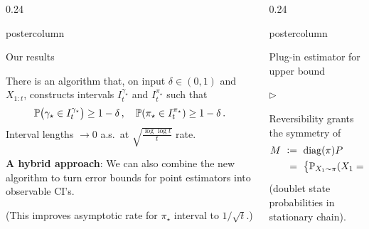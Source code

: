 \documentclass[notheorems,final]{beamer}
\newcommand{\compresslist}{%
  \setlength{\itemsep}{1pt}%
  \setlength{\parskip}{0pt}%
  \setlength{\parsep}{0pt}%
  \setlength{\leftmargin}{0.7cm}%
}
\newlength{\columnheight}
\newcommand\pimin{\ensuremath{\pi_{\star}}}
\newcommand\gap{\ensuremath{\gamma_{\star}}}
\newcommand\states{\ensuremath{\mathcal{X}}}
\begin{document}
\begin{frame}{}
\begin{columns}
\begin{column}{0.24\textwidth}
\begin{beamercolorbox}[center,wd=\textwidth]{postercolumn}
\begin{minipage}[T]{.95\textwidth}
{\begin{block}{Our results}
                \begin{theorem}
                  There is an algorithm that, on input $\delta \in
                  (0,1)$ and $X_{1:t}$, constructs intervals
                  $I_t^{\gap}$ and $I_t^{\pimin}$ such that
                  \[
                    \P\Parens{
                      \gap \in I_t^{\gap}
                    }
                    \geq 1-\delta
                    \,,
                    \quad
                    \P\Parens{
                      \pimin \in I_t^{\pimin}
                    }
                    \geq 1-\delta
                    \,.
                  \]
                  Interval lengths $\to0$ a.s.~at
                  $\sqrt{\frac{\log\log t}{t}}$ rate.
                \end{theorem}

                \bigskip
                \textbf{A hybrid approach}:
                We can also combine the new algorithm to turn error
                bounds for point estimators into observable CI's.

                {\small(This improves asymptotic rate for $\pimin$
                interval to $1/\sqrt{t}$.)}

              \end{block}
            }
          \end{minipage}
        \end{beamercolorbox}
      \end{column}
      \begin{column}{0.24\textwidth}
        \begin{beamercolorbox}[center,wd=\textwidth]{postercolumn}
          \begin{minipage}[T]{.95\textwidth}
            \parbox[t][\columnheight]{\textwidth}{
              \begin{block}{Plug-in estimator for upper bound}
                \begin{list}{$\triangleright$}\compresslist
                  \item
                    Reversibility grants the symmetry of
                    \begin{align*}
                      M
                      & \ := \
                      \diag(\pi) P
                      \\
                      & \ \hphantom:= \
                      \Braces{ \P_{X_1 \sim \pi}(X_1=x,X_2=x') }_{x,x'\in\states}
                    \end{align*}
                    {\small(doublet state probabilities in stationary chain)}.


\end{list}
\end{block}}
\end{minipage}
\end{beamercolorbox}
\end{column}
\end{columns}
\end{frame}
\end{document}
